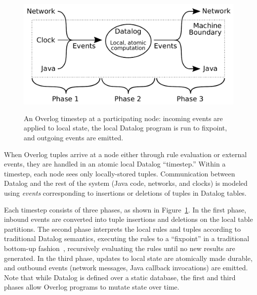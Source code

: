 
\begin{figure}[t]
  \centering
    \includegraphics[width=0.95\linewidth]{jol-node.pdf}
    \label{fig:jol-node}
    \caption{An Overlog timestep at a participating node: incoming
      events are applied to local state, the local Datalog program 
      is run to fixpoint, and outgoing events are emitted.}
\vspace{-8pt}
\end{figure}

When Overlog tuples arrive at a node either through rule evaluation or
external events, they are handled in an atomic local Datalog
``timestep.'' Within a timestep, each node sees only locally-stored
tuples.  Communication between Datalog and the rest of the system
(Java code, networks, and clocks) is modeled using \emph{events}
corresponding to insertions or deletions of tuples in Datalog tables.

Each timestep consists of three phases, as shown in Figure~\ref{fig:jol-node}.
In the first phase, inbound events are converted into tuple insertions and
deletions on the local table partitions.  The second phase interprets the local rules and tuples according to traditional Datalog semantics, executing the rules to a ``fixpoint'' in a traditional bottom-up fashion~\cite{ullmanbook},
recursively evaluating the rules until no new results are generated.  In the
third phase, updates to local state are atomically made durable, and outbound
events (network messages, Java callback invocations) are emitted. Note that
while Datalog is defined over a static database, the first and third phases allow
Overlog programs to mutate state over time.

